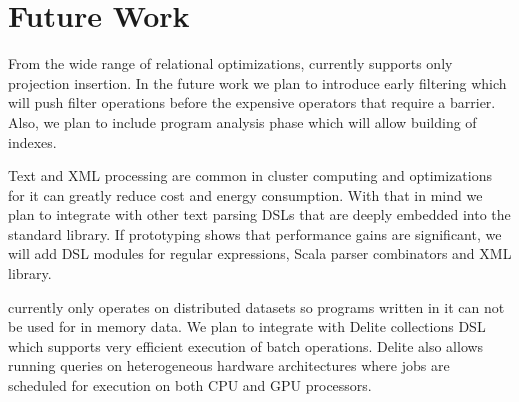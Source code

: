 \section{Future Work}
\label{sec:future-work}

From the wide range of relational optimizations, \tool currently supports only
 projection insertion. In the future work we plan to introduce early filtering
 which will push filter operations before the expensive operators that require a
barrier. Also, we plan to include program analysis phase which will allow
building of indexes.

Text and XML processing are common in cluster computing and optimizations for
it can greatly reduce cost and energy consumption. With that in mind we plan to
integrate \tool with other text parsing DSLs that are deeply embedded into the
standard library. If prototyping shows that performance gains are significant,
we will add DSL modules for regular expressions, Scala parser combinators and XML library.

\tool currently only operates on distributed datasets so programs written in it
can not be used for in memory data. We plan to integrate \tool with Delite
\cite{brown_heterogeneous_2011} collections DSL which supports very efficient
execution of batch operations. Delite also allows running queries on
heterogeneous hardware architectures where jobs are scheduled for execution on
both CPU and GPU processors.
\\
